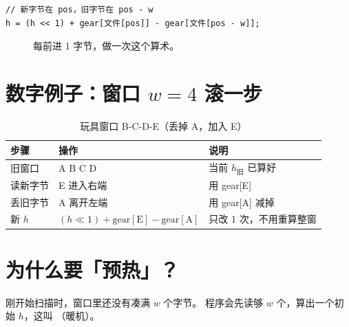 \begin{codebox}
\begin{lstlisting}
// 新字节在 pos，旧字节在 pos - w
h = (h << 1) + gear[文件[pos]] - gear[文件[pos - w]];
\end{lstlisting}
\end{codebox}

\begin{figure}[htbp]
\centering
{}
\caption{每前进 1 字节，做一次这个算术。}
\end{figure}

\section{数字例子：窗口 $w=4$ 滚一步}

\begin{table}[htbp]
\centering
\caption{玩具窗口 B-C-D-E（丢掉 A，加入 E）}
\small
\begin{tabular}{@{}lll@{}}
\toprule
\textbf{步骤} & \textbf{操作} & \textbf{说明} \\
\midrule
旧窗口 & A B C D & 当前 $h_{\text{旧}}$ 已算好 \\
读新字节 & E 进入右端 & 用 gear{[E]} \\
丢旧字节 & A 离开左端 & 用 gear{[A]} 减掉 \\
新 $h$ & $(h \ll 1) + \mathrm{gear[E]} - \mathrm{gear[A]}$ & 只改 1 次，不用重算整窗 \\
\bottomrule
\end{tabular}
\end{table}

\section{为什么要「预热」？}

刚开始扫描时，窗口里还没有凑满 $w$ 个字节。  
程序会先读够 $w$ 个，算出一个初始 $h$，这叫 （暖机）。


